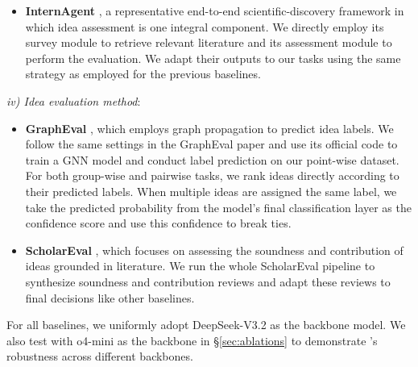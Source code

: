 \begin{itemize}[topsep=0pt,partopsep=0pt,parsep=0pt,itemsep=0pt,leftmargin=*,labelsep=0.5em]
    \item \textbf{InternAgent} \cite{internagent}, a representative end-to-end scientific-discovery framework in which idea assessment is one integral component. We directly employ its survey module to retrieve relevant literature and its assessment module to perform the evaluation. We adapt their outputs to our tasks using the same strategy as employed for the previous baselines.
\end{itemize}
\textit{iv) Idea evaluation method}:
\begin{itemize}[topsep=0pt,partopsep=0pt,parsep=0pt,itemsep=0pt,leftmargin=*,labelsep=0.5em]
    \item \textbf{GraphEval} \cite{grapheval}, which employs graph propagation to predict idea labels. We follow the same settings in the GraphEval paper and use its official code to train a GNN model and conduct label prediction on our point-wise dataset. For both group-wise and pairwise tasks, we rank ideas directly according to their predicted labels. When multiple ideas are assigned the same label, we take the predicted probability from the model’s final classification layer as the confidence score and use this confidence to break ties.
    \item \textbf{ScholarEval} \cite{scholareval}, which focuses on assessing the soundness and contribution of ideas grounded in literature. We run the whole ScholarEval pipeline to synthesize soundness and contribution reviews and adapt these reviews to final decisions like other baselines.
\end{itemize}
For all baselines, we uniformly adopt DeepSeek-V3.2 \cite{deepseek-v3.2} as the backbone model.
We also test with o4-mini \cite{o4-mini} as the backbone in \S\ref{sec:ablations} to demonstrate {\ours}'s robustness across different backbones.